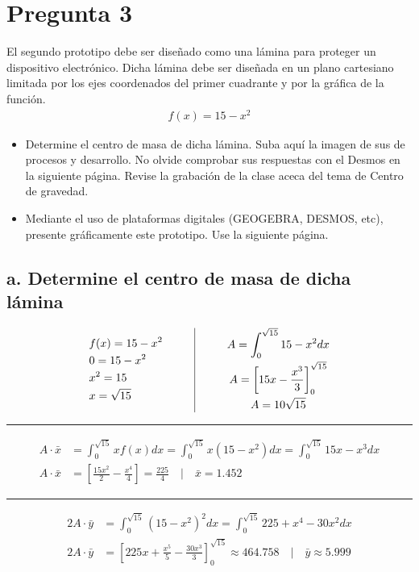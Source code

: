 \section*{Pregunta 3}
\noindent El segundo prototipo debe ser diseñado como una lámina para
proteger un dispositivo electrónico. Dicha lámina debe ser diseñada
en un plano cartesiano limitada por los ejes coordenados del primer
cuadrante y por la gráfica de la función.
\begin{gather*}
  f(x) = 15 - x^2
\end{gather*}
\begin{itemize}
  \item[a.] Determine el centro de masa de dicha lámina. Suba aquí la
    imagen de sus de procesos y desarrollo. No olvide comprobar sus
    respuestas con el Desmos en la siguiente página. Revise la
    grabación de la clase aceca del tema de Centro de gravedad.
  \item[b.] Mediante el uso de plataformas digitales (GEOGEBRA,
    DESMOS, etc), presente gráficamente este prototipo. Use la siguiente página.
\end{itemize}

\subsection*{a. Determine el centro de masa de dicha lámina}
\begin{center}
  \[
    \begin{array}{c@{\hspace{1cm}}|@{\hspace{1cm}}c}
      \begin{aligned}
        & f(x) = 15 - x^2 \\
        & 0 = 15 - x^2 \\
        & x^2 = 15 \\
        & x = \sqrt{15}
      \end{aligned}
      &
      \begin{gathered}
        A = \int_0^{\sqrt{15}} 15 - x^2 dx \\
        A = \left[15x - \frac{x^3}{3}\right]_0^{\sqrt{15}} \\
        A = 10\sqrt{15}
      \end{gathered}
    \end{array}
  \]
  \rule{\textwidth}{0.4pt}
  \begin{align*}
    A \cdot \bar{x} &= \int_0^{\sqrt{15}} x f(x) dx =
    \int_0^{\sqrt{15}} x \left(15 - x^2\right) dx =
    \int_0^{\sqrt{15}} 15x - x^3 dx \\
    A \cdot \bar{x} &= \left[\frac{15x^2}{2} - \frac{x^4}{4}\right] =
    \frac{225}{4} \quad \Bigg| \quad \bar{x} = 1.452
  \end{align*}
  \rule{\textwidth}{0.4pt}
  \begin{align*}
    2A \cdot \bar{y} &= \int_0^{\sqrt{15}} \left(15 - x^2\right)^2 dx
    = \int_0^{\sqrt{15}} 225 + x^4 - 30x^2 dx \\
    2A \cdot \bar{y} &= \left[225x + \frac{x^5}{5} -
    \frac{30x^3}{3}\right]_0^{\sqrt{15}} \approx 464.758 \quad \Bigg|
    \quad \bar{y} \approx 5.999
  \end{align*}
\end{center}

